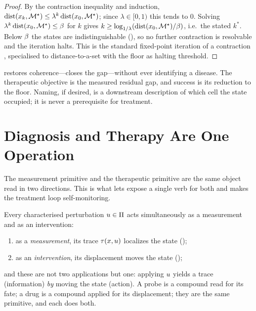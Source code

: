 \begin{proof}
By the contraction inequality and induction,
$\operatorname{dist}(x_k,\mathcal{M}^{\star})\le\lambda^{k}\operatorname{dist}(x_0,\mathcal{M}^{\star})$; since $\lambda\in[0,1)$ this
tends to $0$. Solving $\lambda^{k}\operatorname{dist}(x_0,\mathcal{M}^{\star})\le\beta$ for $k$ gives
$k\ge\log_{1/\lambda}(\operatorname{dist}(x_0,\mathcal{M}^{\star})/\beta)$, i.e.\ the stated $k^{\ast}$.
Below $\beta$ the states are indistinguishable (), so no
further contraction is resolvable and the iteration halts. This is the standard
fixed-point iteration of a contraction \citep{Banach1922}, specialised to
distance-to-a-set with the floor as halting threshold.
\end{proof}

\begin{principle}
\label{cfc:prin:cure}
 restores coherence---closes the gap---without ever
identifying a disease. The therapeutic objective is the measured residual gap,
and success is its reduction to the floor. Naming, if desired, is a downstream
description of which cell the state occupied; it is never a prerequisite for
treatment.
\end{principle}

\section{Diagnosis and Therapy Are One Operation}
\label{cfc:sec:unity}

The measurement primitive and the therapeutic primitive are the same object
read in two directions. This is what lets  expose a single verb for
both and makes the treatment loop self-monitoring.

\begin{theorem}
\label{cfc:thm:unity}
Every characterised perturbation $u\in\Pi$ acts simultaneously as a
measurement and as an intervention:
\begin{enumerate}[label=\textup{(\roman*)},leftmargin=2.2em,itemsep=2pt]
\item as a \emph{measurement}, its trace $\tau(x,u)$ localizes the
state ();
\item as an \emph{intervention}, its displacement moves the state
();
\end{enumerate}
and these are not two applications but one: applying $u$ yields a trace
(information) \emph{by} moving the state (action). A probe is a compound read
for its fate; a drug is a compound applied for its displacement; they are the
same primitive, and each does both.
\end{theorem}

